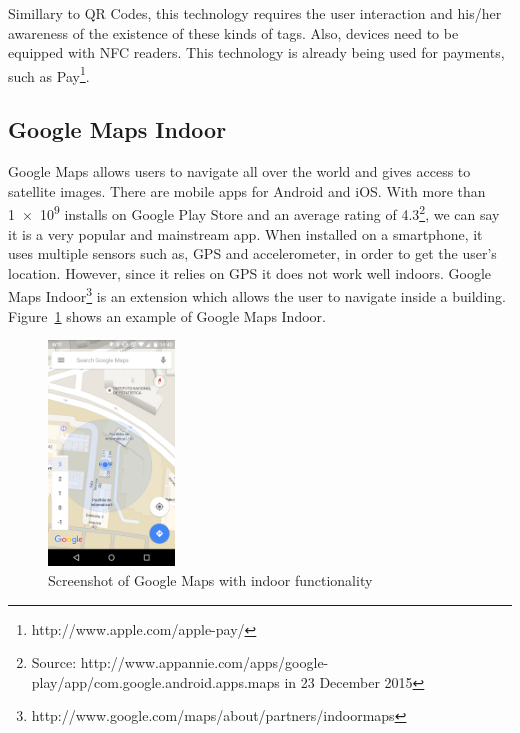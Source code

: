 Simillary to \gls{QR} Codes, this technology requires the user interaction and his/her awareness of the existence of these kinds of tags.
Also, devices need to be equipped with \gls{NFC} readers.
This technology is already being used for payments, such as  Pay\footnote{http://www.apple.com/apple-pay/}.

\subsection{Google Maps Indoor}
\label{sub:background_google_maps_indoor}
Google Maps allows users to navigate all over the world and gives access to satellite images.
There are mobile apps for Android and iOS.
With more than \num{1e9} installs on Google Play Store and an average rating of 4.3\footnote{Source: http://www.appannie.com/apps/google-play/app/com.google.android.apps.maps in 23 December 2015}, we can say it is a very popular and mainstream app.
When installed on a smartphone, it uses multiple sensors such as, \gls{GPS} and accelerometer, in order to get the user's location.
However, since it relies on \gls{GPS} it does not work well indoors.
Google Maps Indoor\footnote{http://www.google.com/maps/about/partners/indoormaps} is an extension which allows the user to navigate inside a building.
Figure~\ref{fig:google_maps_indoor} shows an example of Google Maps Indoor.

\begin{figure}[!ht]
  \centering
    \includegraphics[width=0.3\textwidth, keepaspectratio]{images/screenshots/google_maps_indoor}
    \caption[Google Maps Indoor]{Screenshot of Google Maps with indoor functionality}
    \label{fig:google_maps_indoor}
\end{figure}

